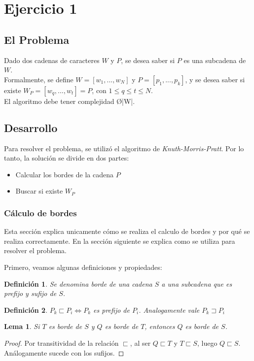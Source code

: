 \newtheorem*{definition}{Definición}
\newtheorem{lem}{Lema}
\section{Ejercicio 1}
\subsection{El Problema}
Dado dos cadenas de caracteres $W$ y $P$, se desea saber si $P$ es una subcadena de $W$.\\
Formalmente, se define $W = [w_1,...,w_N]$ y $P = [p_1,...,p_k]$, y se desea saber si existe $W_P = [w_q,...,w_t] = P$, con $1 \leq q \leq t \leq N$.\\
El algoritmo debe tener complejidad \O{|W|}.

\subsection{Desarrollo}
Para resolver el problema, se utilizó el algoritmo de \emph{Knuth-Morris-Pratt}.
Por lo tanto, la solución se divide en dos partes:
\begin{itemize}
	\item Calcular los bordes de la cadena $P$
	\item Buscar si existe $W_P$
\end{itemize}

\subsubsection{Cálculo de bordes}
Esta sección explica unicamente cómo se realiza el calculo de bordes y por qué se realiza correctamente. En la sección siguiente se explica como se utiliza para resolver el problema.

Primero, veamos algunas definiciones y propiedades:
\begin{definition}
Se denomina borde de una cadena $S$ a una subcadena que es prefijo y sufijo de $S$.
\end{definition}
\begin{definition}
$P_k \sqsubset P_i \Leftrightarrow P_k$ es prefijo de $P_i$. Analogamente vale $P_k \sqsupset P_i$
\end{definition}

\begin{lem}
Si $T$ es borde de $S$ y $Q$ es borde de $T$, entonces $Q$ es borde de $S$.
\end{lem}
\begin{proof}
Por transitividad de la relación $\sqsubset$, al ser $Q \sqsubset T$ y $T \sqsubset S$, luego $Q \sqsubset S$. Análogamente sucede con los sufijos.
\end{proof}

